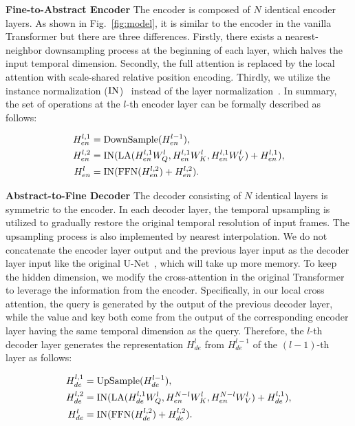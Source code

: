 \documentclass[letterpaper]{article} \usepackage[submission]{aaai23}  \usepackage{times}  \usepackage{helvet}  \usepackage{courier}  \usepackage[hyphens]{url}  \usepackage{graphicx} \urlstyle{rm} \def\UrlFont{\rm}  \usepackage{natbib}  \usepackage{caption} \frenchspacing  \setlength{\pdfpagewidth}{8.5in} \setlength{\pdfpageheight}{11in} \usepackage{algorithm}
\begin{document}
\textbf{Fine-to-Abstract Encoder}\quad 
The encoder is composed of $N$ identical encoder layers. As shown in Fig.~\ref{fig:model}, it is similar to the encoder in the vanilla Transformer but there are three differences. Firstly, there exists a nearest-neighbor downsampling process at the beginning of each layer, which halves the input temporal dimension. Secondly, the full attention is replaced by the local attention with scale-shared relative position encoding. Thirdly, we utilize the instance normalization ($\textup{IN}$)~\cite{ulyanov2016instance} instead of the layer normalization~\cite{layernorm}. In summary, the set of operations at the $l$-th encoder layer can be formally described as follows: 
\begin{footnotesize}
\begin{equation}
\begin{aligned}
H^{l,1}_{en} &= \textup{DownSample}(H^{l-1}_{en}),\\
H^{l,2}_{en} &= \textup{IN}(\textup{LA}(H^{l,1}_{en}W_{Q}^l, H^{l,1}_{en}W_{K}^l, H^{l,1}_{en}W_{V}^l)+H^{l,1}_{en}),\\
H^{l}_{en} &= \textup{IN}(\textup{FFN}(H^{l,2}_{en})+H^{l,2}_{en}).
\end{aligned}
\end{equation}
\end{footnotesize}


\textbf{Abstract-to-Fine Decoder}\quad 
The decoder consisting of $N$ identical layers is symmetric to the encoder. In each decoder layer, the temporal upsampling is utilized to gradually restore the original temporal resolution of input frames. The upsampling process is also implemented by nearest interpolation. We do not concatenate the encoder layer output and the previous layer input as the decoder layer input like the original U-Net~\cite{ron2015unet}, which will take up more memory. To keep the hidden dimension, we modify the cross-attention in the original Transformer to leverage the information from the encoder. Specifically, in our local cross attention, the query is generated by the output of the previous decoder layer, while the value and key both come from the output of the corresponding encoder layer having the same temporal dimension as the query. Therefore, the $l$-th decoder layer generates the representation $H_{de}^{l}$ from $H_{de}^{l-1}$ of the $(l\!-\!1)$-th layer as follows:
\begin{footnotesize}
\begin{equation}
\begin{aligned}
H^{l,1}_{de} &= \textup{UpSample}(H_{de}^{l-1}),\\
H^{l,2}_{de} &= \textup{IN}(\textup{LA}(H_{de}^{l,1}W_{Q}^l, H_{en}^{N-l}W_{K}^l, H_{en}^{N-l}W_{V}^l)+H_{de}^{l,1}),\\
H^{l}_{de} &= \textup{IN}(\textup{FFN}(H_{de}^{l,2})+H_{de}^{l,2}).
\end{aligned}
\end{equation}
\end{footnotesize}
\end{document}
